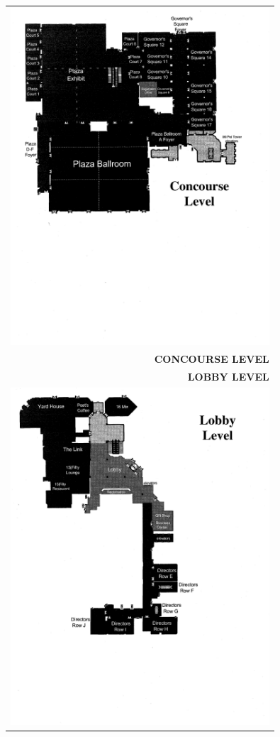 
\thispagestyle{empty}
\begin{center}
  \begin{tabular}{r}
    \includegraphics[width=3.8in]{content/hotel-map-1.pdf} \\
    \textbf{CONCOURSE LEVEL}\\\hline
    \textbf{LOBBY LEVEL}\\
    \includegraphics[width=3.8in]{content/hotel-map-2.pdf}
  \end{tabular}
\end{center}

